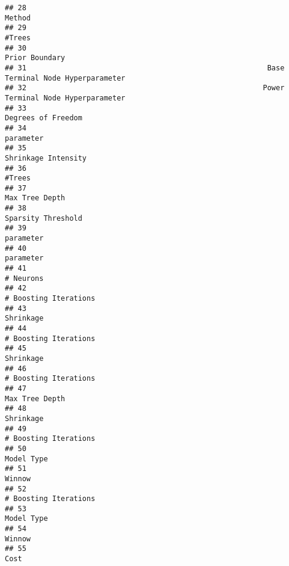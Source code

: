 \documentclass[
]{article}
\begin{document}
\begin{verbatim}
## 28                                                                                   Method
## 29                                                                                   #Trees
## 30                                                                           Prior Boundary
## 31                                                        Base Terminal Node Hyperparameter
## 32                                                       Power Terminal Node Hyperparameter
## 33                                                                       Degrees of Freedom
## 34                                                                                parameter
## 35                                                                      Shrinkage Intensity
## 36                                                                                   #Trees
## 37                                                                           Max Tree Depth
## 38                                                                       Sparsity Threshold
## 39                                                                                parameter
## 40                                                                                parameter
## 41                                                                                # Neurons
## 42                                                                    # Boosting Iterations
## 43                                                                                Shrinkage
## 44                                                                    # Boosting Iterations
## 45                                                                                Shrinkage
## 46                                                                    # Boosting Iterations
## 47                                                                           Max Tree Depth
## 48                                                                                Shrinkage
## 49                                                                    # Boosting Iterations
## 50                                                                               Model Type
## 51                                                                                   Winnow
## 52                                                                    # Boosting Iterations
## 53                                                                               Model Type
## 54                                                                                   Winnow
## 55                                                                                     Cost

\end{verbatim}
\end{document}
